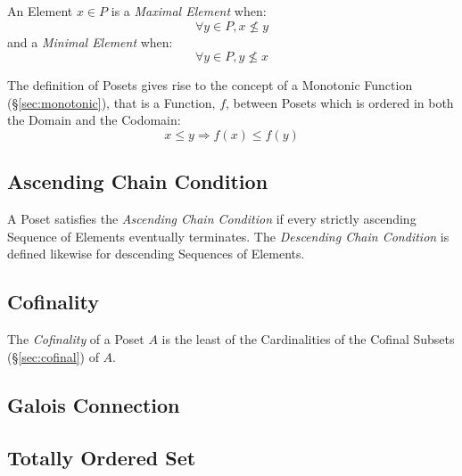 An Element $x \in P$ is a \emph{Maximal Element} when:
\[
  \forall y \in P, x \nleq y
\]
and a \emph{Minimal Element} when:
\[
  \forall y \in P, y \nleq x
\]

The definition of Posets gives rise to the concept of a Monotonic
Function (\S\ref{sec:monotonic}), that is a Function, $f$, between
Posets which is ordered in both the Domain and the Codomain:
\[
  x \leq y \Rightarrow f(x) \leq f(y)
\]



\subsection{Ascending Chain Condition}\label{sec:ascending_chain}

A Poset satisfies the \emph{Ascending Chain Condition} if every
strictly ascending Sequence of Elements eventually terminates. The
\emph{Descending Chain Condition} is defined likewise for descending
Sequences of Elements.



\subsection{Cofinality}\label{sec:cofinality}

The \emph{Cofinality} of a Poset $A$ is the least of the Cardinalities
of the Cofinal Subsets (\S\ref{sec:cofinal}) of $A$.



\subsection{Galois Connection}\label{sec:galois_connection}



\subsection{Totally Ordered Set}\label{sec:totally_ordered}

